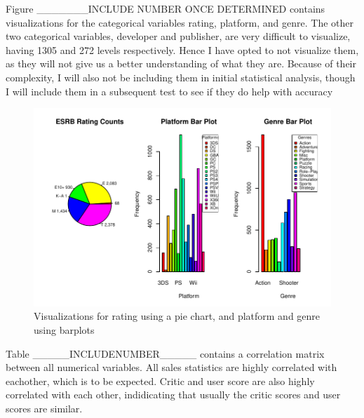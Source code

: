 \documentclass[12pt]{article}
\begin{document}
Figure _______INCLUDE NUMBER ONCE DETERMINED contains visualizations for the categorical variables rating, platform, and genre.
The other two categorical variables, developer and publisher, are very difficult to visualize, having 1305 and 272 levels respectively.
Hence I have opted to not visualize them, as they will not give us a better understanding of what they are. Because of their complexity, 
I will also not be including them in initial statistical analysis, though I will include them in a subsequent test to see if they do 
help with accuracy

\begin{figure}[tbp]
  \centering
  \includegraphics[width=\textwidth]{categoricalplots.pdf}
  \caption{Visualizations for rating using a pie chart, and platform and genre using barplots}
  \label{fig:categoricalplots}
\end{figure}


Table _____INCLUDENUMBER_____ contains a correlation matrix between all numerical variables. All sales statistics are highly
correlated with eachother, which is to be expected. Critic and user score are also highly correlated with each other, indidicating
that usually the critic scores and user scores are similar.
\end{document}
